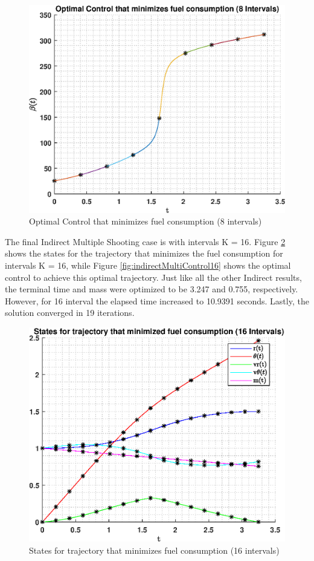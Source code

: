 \documentclass[]{article}
\begin{document}
\begin{figure}
	\centering
	\includegraphics[scale=0.75]{indirectMultiControl8.eps}
	\caption{Optimal Control that minimizes fuel consumption (8 intervals)}
	\label{fig:indirectMultiControl8}
\end{figure}
\vspace{2mm}\newline 
The final Indirect Multiple Shooting case is with intervals K = 16. Figure \ref{fig:indirectMultiStates16} shows the states for the trajectory that minimizes the fuel consumption for intervals K = 16, while Figure \ref{fig:indirectMultiControl16} shows the optimal control to achieve this optimal trajectory. Just like all the other Indirect results, the terminal time and mass were optimized to be 3.247 and 0.755, respectively. However, for 16 interval the elapsed time increased to 10.9391 seconds. Lastly, the solution converged in 19 iterations.
\begin{figure}
	\centering
	\includegraphics[scale=0.75]{indirectMultiStates16.eps}
	\caption{States for trajectory that minimizes fuel consumption (16 intervals)}
	\label{fig:indirectMultiStates16}
\end{figure}
\end{document}
